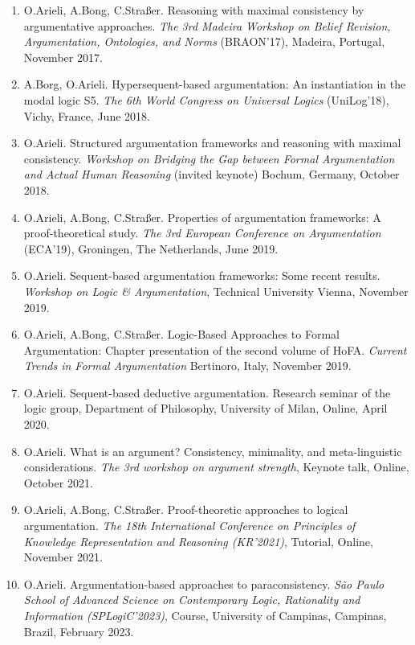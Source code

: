 \documentclass{article}
\begin{document}
\begin{enumerate}
  \item O.Arieli, A.Bong, C.Stra{\ss}er.
          Reasoning with maximal consistency by argumentative approaches.
          {\em The 3rd  Madeira Workshop on Belief Revision, Argumentation, Ontologies, and Norms\/}
          (BRAON'17), Madeira, Portugal, November 2017.

  \item A.Borg, O.Arieli.
           Hypersequent-based argumentation: An instantiation in the modal logic S5.
          {\em The 6th World Congress on Universal Logics\/} (UniLog'18), Vichy, France, June 2018.

  \item O.Arieli. Structured argumentation frameworks and reasoning with maximal consistency.
          {\em Workshop on Bridging the Gap between Formal Argumentation and Actual Human Reasoning\/}
          (invited keynote) Bochum, Germany, October 2018.

  \item O.Arieli, A.Bong, C.Stra{\ss}er.
          Properties of argumentation frameworks: A proof-theoretical study.
          {\em The 3rd  European Conference on Argumentation\/} (ECA'19), Groningen, The Netherlands,
          June 2019.

  \item O.Arieli. Sequent-based argumentation frameworks: Some recent results. {\em Workshop on Logic \& Argumentation\/},
          Technical University Vienna, November 2019.

  \item O.Arieli, A.Bong, C.Stra{\ss}er.
          Logic-Based Approaches to Formal Argumentation: Chapter presentation of the second volume of HoFA.
          {\em Current Trends in Formal Argumentation\/} Bertinoro, Italy, November 2019.

   \item O.Arieli. Sequent-based deductive argumentation. Research seminar of the logic group, Department of Philosophy,
           University of Milan, Online, April 2020.

   \item O.Arieli. What is an argument? Consistency, minimality, and meta-linguistic considerations. {\em The 3rd workshop on
             argument strength\/}, Keynote talk, Online, October 2021.

   \item O.Arieli, A.Bong, C.Stra{\ss}er. Proof-theoretic approaches to logical argumentation. {\em The 18th International Conference
            on Principles of Knowledge Representation and Reasoning (KR’2021)\/}, Tutorial, Online, November 2021.
            
   \item O.Arieli. Argumentation-based approaches to paraconsistency. {\em São Paulo School of Advanced Science on Contemporary Logic, 
            Rationality and Information (SPLogiC'2023)\/}, Course, University of Campinas, Campinas, Brazil, February 2023. 

\end{enumerate}
\end{document}
